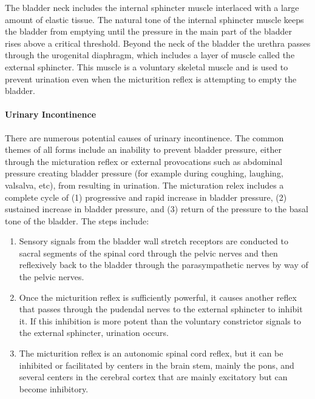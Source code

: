 The bladder neck includes the internal sphincter muscle interlaced with a large amount of elastic tissue. The natural tone of the internal sphincter muscle keeps the bladder from emptying until the pressure in the main part of the bladder rises above a critical threshold. Beyond the neck of the bladder the urethra passes through the urogenital diaphragm, which includes a layer of muscle called the external sphincter. This muscle is a voluntary skeletal muscle and is used to prevent urination even when the micturition reflex is attempting to empty the bladder.

\paragraph{Urinary Incontinence}

There are numerous potential causes of urinary incontinence. The common themes of all forms include an inability to prevent bladder pressure, either through the micturation reflex or external provocations such as abdominal pressure creating bladder pressure (for example during coughing, laughing, valsalva, etc), from resulting in urination. The micturation relex includes a complete cycle of (1) progressive and rapid increase in bladder pressure, (2) sustained increase in bladder pressure, and (3) return of the pressure to the basal tone of the bladder. 
\vspace{4mm}
The steps include:

\begin{enumerate}
    \item Sensory signals from the bladder wall stretch receptors are conducted to sacral segments of the spinal cord through the pelvic nerves and then reflexively back to the bladder through the parasympathetic nerves by way of the pelvic nerves.
    \item  Once the micturition reflex is sufficiently powerful, it causes another reflex that passes through the pudendal nerves to the external sphincter to inhibit it. If this inhibition is more potent than the voluntary constrictor signals to the external sphincter, urination occurs.
    \item  The micturition reflex is an autonomic spinal cord reflex, but it can be inhibited or facilitated by centers in the brain stem, mainly the pons, and several centers in the cerebral cortex that are mainly excitatory but can become inhibitory.
\end{enumerate}

